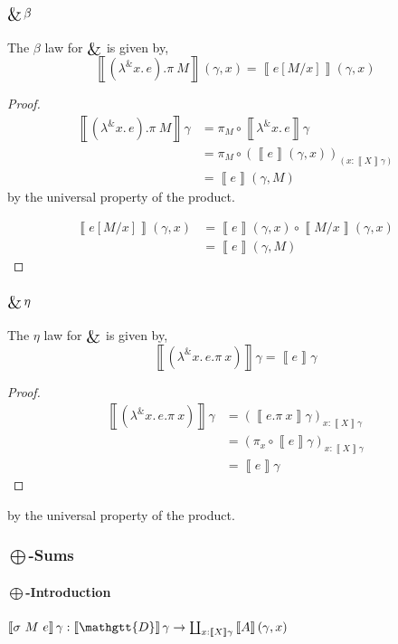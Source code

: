 \documentclass[acmsmall,nonacm]{acmart}
\renewcommand{\Delta}{\mathgtt{D}}
\newcommand{\sem}[1]{\left\llbracket{#1}\right\rrbracket}
\newcommand{\semg}[1]{\sem{#1}\gamma}
\DeclareMathOperator*{\bigamp}{\scalerel*{\&}{\bigoplus}}
\newcommand{\dlamb}[2]{{\lambda}^{{\&}} #1.\, #2}
\begin{document}
\paragraph{$\bigamp\beta$}
The $\beta$ law for $\bigamp$ is given by,
\[
  \sem{(\dlamb x e).\pi~M}(\gamma, x) = \sem{e[M/x]}(\gamma, x)
\]
\begin{proof}
\begin{align*}
  \semg{(\dlamb x e).\pi~M}
  & = \pi_{M} \circ \semg{\dlamb x e} \\
  & = \pi_{M} \circ (\sem{e}(\gamma , x))_{(x : \semg{X})} \\
  & = \sem{e}(\gamma , M)
\end{align*}
by the universal property of the product.


\begin{align*}
  \sem{e[M/x]}(\gamma , x)
  & = \sem{e}(\gamma , x) \circ  \sem{M/x}(\gamma , x) \\
  & = \sem{e}(\gamma , M)
\end{align*}
\end{proof}

\paragraph{$\bigamp\eta$}
The $\eta$ law for $\bigamp$ is given by,
\[
  \semg{(\dlamb x {e.\pi~x})} = \semg{e}
\]
\begin{proof}
\begin{align*}
  \semg{(\dlamb x {e.\pi~x})}
  & = (\semg{e.\pi~x})_{x : \semg{X}} \\
  & = (\pi_x \circ \semg{e})_{x : \semg{X}} \\
  & = \semg{e}
\end{align*}
\end{proof}
by the universal property of the product.

\subsubsection{$\bigoplus$-Sums}
\paragraph{$\bigoplus$-Introduction}
$\semg{\sigma~M~e} : \semg{\Delta} \to \coprod_{x : \semg{X}} \sem{A}(\gamma, x)$

\begin{center}
\end{center}
\end{document}
